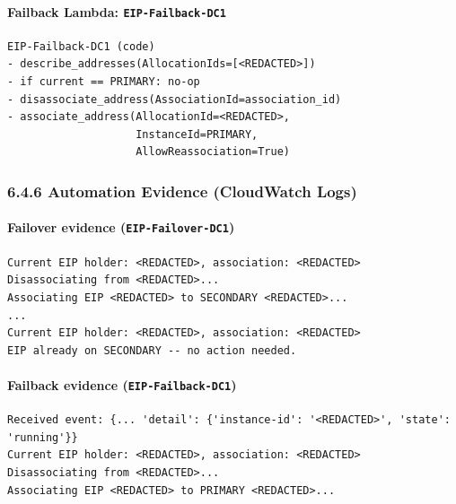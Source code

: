 \documentclass[11pt]{article}
\begin{document}
\paragraph{Failback Lambda: \texttt{EIP-Failback-DC1}}

\begin{verbatim}
EIP-Failback-DC1 (code)
- describe_addresses(AllocationIds=[<REDACTED>])
- if current == PRIMARY: no-op
- disassociate_address(AssociationId=association_id)
- associate_address(AllocationId=<REDACTED>,
                    InstanceId=PRIMARY,
                    AllowReassociation=True)
\end{verbatim}

%
%
%
\subsubsection{6.4.6 Automation Evidence (CloudWatch Logs)}

\paragraph{Failover evidence (\texttt{EIP-Failover-DC1})}
\begin{verbatim}
Current EIP holder: <REDACTED>, association: <REDACTED>
Disassociating from <REDACTED>...
Associating EIP <REDACTED> to SECONDARY <REDACTED>...
...
Current EIP holder: <REDACTED>, association: <REDACTED>
EIP already on SECONDARY -- no action needed.
\end{verbatim}

\paragraph{Failback evidence (\texttt{EIP-Failback-DC1})}
\begin{verbatim}
Received event: {... 'detail': {'instance-id': '<REDACTED>', 'state': 'running'}}
Current EIP holder: <REDACTED>, association: <REDACTED>
Disassociating from <REDACTED>...
Associating EIP <REDACTED> to PRIMARY <REDACTED>...
\end{verbatim}
\end{document}
